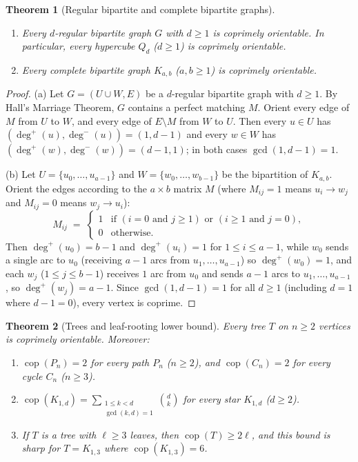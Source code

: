 \documentclass[11pt,a4paper]{article}
\newtheorem{theorem}{Theorem}[section]
\theoremstyle{definition}
\theoremstyle{remark}
\newcommand{\cop}{\operatorname{cop}}
\newcommand{\outdeg}{\deg^{+}}
\newcommand{\indeg}{\deg^{-}}
\begin{document}
\begin{theorem}[Regular bipartite and complete bipartite graphs]\label{thm:bipartite}
\leavevmode
\begin{enumerate}[label=(\alph*)]
  \item Every $d$-regular bipartite graph $G$ with $d \ge 1$ is coprimely orientable. In particular, every hypercube $Q_d$ ($d \ge 1$) is coprimely orientable.
  \item Every complete bipartite graph $K_{a,b}$ ($a, b \ge 1$) is coprimely orientable.
\end{enumerate}
\end{theorem}

\begin{proof}
(a) Let $G = (U \cup W, E)$ be a $d$-regular bipartite graph with $d \ge 1$. By Hall's Marriage Theorem, $G$ contains a perfect matching $M$. Orient every edge of $M$ from $U$ to $W$, and every edge of $E \setminus M$ from $W$ to $U$. Then every $u \in U$ has $(\outdeg(u), \indeg(u)) = (1, d - 1)$ and every $w \in W$ has $(\outdeg(w), \indeg(w)) = (d - 1, 1)$; in both cases $\gcd(1, d - 1) = 1$.

(b) Let $U = \{u_0, \dots, u_{a-1}\}$ and $W = \{w_0, \dots, w_{b-1}\}$ be the bipartition of $K_{a,b}$. Orient the edges according to the $a \times b$ matrix $M$ (where $M_{ij} = 1$ means $u_i \to w_j$ and $M_{ij} = 0$ means $w_j \to u_i$):
\[
  M_{ij} \;=\;
  \begin{cases}
    1 & \text{if } (i = 0 \text{ and } j \ge 1) \text{ or } (i \ge 1 \text{ and } j = 0),\\
    0 & \text{otherwise.}
  \end{cases}
\]
Then $\outdeg(u_0) = b - 1$ and $\outdeg(u_i) = 1$ for $1 \le i \le a - 1$, while $w_0$ sends a single arc to $u_0$ (receiving $a - 1$ arcs from $u_1, \dots, u_{a-1}$) so $\outdeg(w_0) = 1$, and each $w_j$ ($1 \le j \le b - 1$) receives $1$ arc from $u_0$ and sends $a - 1$ arcs to $u_1, \dots, u_{a-1}$, so $\outdeg(w_j) = a - 1$. Since $\gcd(1, d - 1) = 1$ for all $d \ge 1$ (including $d = 1$ where $d - 1 = 0$), every vertex is coprime.
\end{proof}

\begin{theorem}[Trees and leaf-rooting lower bound]\label{thm:trees}
Every tree $T$ on $n \ge 2$ vertices is coprimely orientable. Moreover:
\begin{enumerate}[label=(\roman*)]
  \item $\cop(P_n) = 2$ for every path $P_n$ ($n \ge 2$), and $\cop(C_n) = 2$ for every cycle $C_n$ ($n \ge 3$).
  \item $\cop(K_{1,d}) = \sum_{\substack{1 \le k < d \\ \gcd(k,d)=1}} \binom{d}{k}$ for every star $K_{1,d}$ ($d \ge 2$).
  \item If $T$ is a tree with $\ell \ge 3$ leaves, then $\cop(T) \ge 2\ell$, and this bound is sharp for $T = K_{1,3}$ where $\cop(K_{1,3}) = 6$.
\end{enumerate}
\end{theorem}
\end{document}

